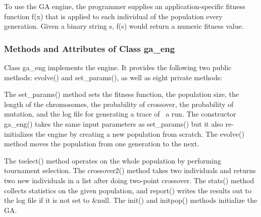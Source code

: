 To use the GA engine, the programmer supplies an application-specific
fitness function \textsf{f(x)} that is applied to each individual of
the population every generation. Given a binary string \textsf{s},
\textsf{f(s)} would return a numeric fitness value.

\subsubsection[Methods and Attributes of Class ga\_eng]{Methods and
Attributes of Class ga\_eng}

Class \textsf{ga\_eng} implements the engine. It provides the following
two public methods: \textsf{evolve()} and \textsf{set\_params()}, as
well as eight private methods: 


The \textsf{set\_params()} method sets the fitness function, the
population size, the length of the chromosomes, the probability of
crossover, the probability of mutation, and the log file for generating
a trace of \ a run. The constructor
\textsf{ga\_eng()} takes the same input parameters as
\textsf{set\_params()} but it also re-initializes the engine by
creating a new population from scratch. The \textsf{evolve()} method
moves the population from one generation to the next.

The \textsf{tselect()} method operates on the whole population by
performing tournament selection. The \textsf{crossover2()} method takes
two individuals and returns two new individuals in a list after doing
two-point crossover. The \textsf{stats()} method collects statistics on
the given population, and \textsf{report()} writes the results out to
the log file if it is not set to \textsf{\&null}. The \textsf{init()}
and \textsf{initpop()} methods initialize the GA.

